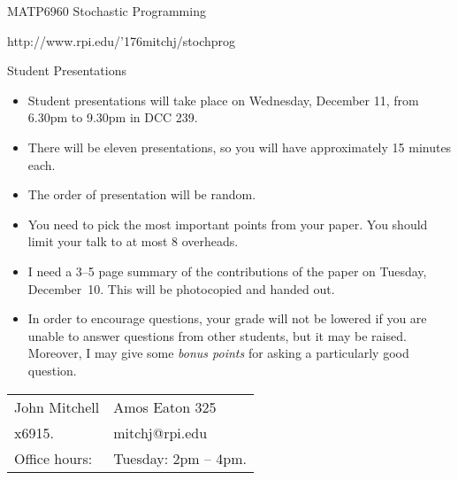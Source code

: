 \documentclass[12pt]{article}
\newcommand{\til}{\char '176}
\begin{document}
\begin{center}
  \begin{large}
     MATP6960 Stochastic Programming
  \end{large}
\end{center}

\begin{center}
http://www.rpi.edu/\til mitchj/stochprog
\end{center}

\begin{center}
  \begin{large}
 Student Presentations
  \end{large}
\end{center}


\vspace{\baselineskip}


\begin{itemize}
\item
Student presentations will take place on Wednesday, December 11,
from 6.30pm to 9.30pm in DCC 239.
\item
There will be eleven presentations, so you will have approximately 15
minutes each.
\item
The order of presentation will be random.
\item
You need to pick the most important points from your paper.
You should limit your talk to at most 8 overheads.
\item
I need a 3--5 page summary of the contributions of the paper
on Tuesday, December~10.
This will be photocopied and handed out.
\item
In order to encourage questions, your grade will not be lowered if you
are unable to answer questions from other students, but it may be raised.
Moreover, I may give some
{\em bonus points} for asking a particularly good question.
\end{itemize}

\vfill

\begin{tabular}{@{\hspace{.5in}}ll}
   John Mitchell  &
   Amos Eaton 325  \\
   x6915.  &
   mitchj@rpi.edu  \\
   Office hours:  &
   Tuesday: 2pm -- 4pm.
\end{tabular}
\end{document}
